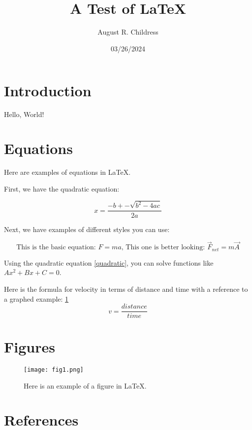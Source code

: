 \documentclass{article}
\author{August R. Childress}
\title{A Test of LaTeX}
\date{03/26/2024}
\begin{document}
\maketitle

\section{Introduction}
Hello, World! \cite{ECP}

\section{Equations}
Here are examples of equations in LaTeX.

First, we have the quadratic equation:

\begin{equation}\label{quadratic}
x = \frac{-b +- \sqrt{b^{2}-4ac}}{2a}
\end{equation}

Next, we have examples of different styles you can use:



\begin{equation}
	\textrm{This is the basic equation: }
	F = ma
	\textrm{, This one is better looking: }
	\vec{F}_{net} = m\vec{A}
\end{equation}

Using the quadratic equation \ref{quadratic}, you can solve functions like $Ax^2 + Bx + C = 0$.

Here is the formula for velocity in terms of distance and time with a reference to a graphed example: \ref{fig1}
\begin{equation}
v = \frac{distance}{time} 
\end{equation}


\section{Figures}

\begin{figure} [h!]
\begin{center}
\texttt{[image: fig1.png]}
\end{center}
\label{fig1}
\caption{Here is an example of a figure in LaTeX.}

\end{figure}

\section{References}


\end{document}
